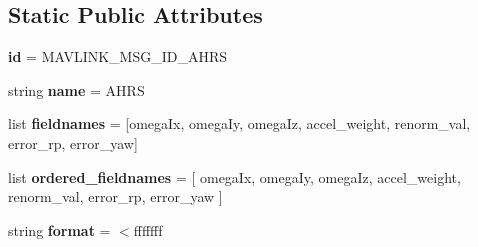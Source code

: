 \subsection*{Static Public Attributes}
\begin{DoxyCompactItemize}
\item 
\mbox{\label{classpymavlink_1_1dialects_1_1v10_1_1MAVLink__ahrs__message_aa0a56373b7c2677657653057c60b4b88}} 
{\bfseries id} = M\+A\+V\+L\+I\+N\+K\+\_\+\+M\+S\+G\+\_\+\+I\+D\+\_\+\+A\+H\+RS
\item 
\mbox{\label{classpymavlink_1_1dialects_1_1v10_1_1MAVLink__ahrs__message_aa31eb904121ea832f44362d0212efec7}} 
string {\bfseries name} = \textquotesingle{}A\+H\+RS\textquotesingle{}
\item 
\mbox{\label{classpymavlink_1_1dialects_1_1v10_1_1MAVLink__ahrs__message_a54a6ddc301a5d4974a76c7e1d09d7261}} 
list {\bfseries fieldnames} = \mbox{[}\textquotesingle{}omega\+Ix\textquotesingle{}, \textquotesingle{}omega\+Iy\textquotesingle{}, \textquotesingle{}omega\+Iz\textquotesingle{}, \textquotesingle{}accel\+\_\+weight\textquotesingle{}, \textquotesingle{}renorm\+\_\+val\textquotesingle{}, \textquotesingle{}error\+\_\+rp\textquotesingle{}, \textquotesingle{}error\+\_\+yaw\textquotesingle{}\mbox{]}
\item 
\mbox{\label{classpymavlink_1_1dialects_1_1v10_1_1MAVLink__ahrs__message_ab3cd49f38b94cfdc61d97e2892bc94c6}} 
list {\bfseries ordered\+\_\+fieldnames} = \mbox{[} \textquotesingle{}omega\+Ix\textquotesingle{}, \textquotesingle{}omega\+Iy\textquotesingle{}, \textquotesingle{}omega\+Iz\textquotesingle{}, \textquotesingle{}accel\+\_\+weight\textquotesingle{}, \textquotesingle{}renorm\+\_\+val\textquotesingle{}, \textquotesingle{}error\+\_\+rp\textquotesingle{}, \textquotesingle{}error\+\_\+yaw\textquotesingle{} \mbox{]}
\item 
\mbox{\label{classpymavlink_1_1dialects_1_1v10_1_1MAVLink__ahrs__message_a70e49088f10a22d67b9a13d1d8ae60d1}} 
string {\bfseries format} = \textquotesingle{}$<$fffffff\textquotesingle{}

\end{DoxyCompactItemize}
